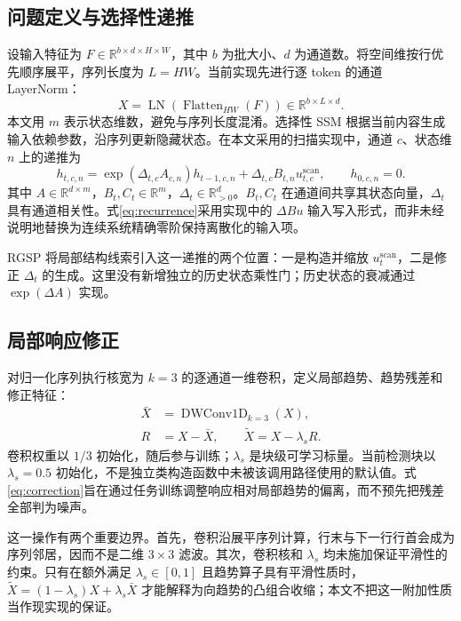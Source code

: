\documentclass[UTF8,11pt,a4paper,fontset=fandol]{ctexart}
\newcommand{\LN}{\operatorname{LN}}
\newcommand{\R}{\mathbb{R}}
\begin{document}
\subsection{问题定义与选择性递推}
设输入特征为 $F\in\R^{b\times d\times H\times W}$，其中 $b$ 为批大小、$d$ 为通道数。将空间维按行优先顺序展平，序列长度为 $L=HW$。当前实现先进行逐 token 的通道 LayerNorm：
\begin{equation}
X=\LN\!\left(\operatorname{Flatten}_{HW}(F)\right)\in\R^{b\times L\times d}.
\label{eq:tokens}
\end{equation}
本文用 $m$ 表示状态维数，避免与序列长度混淆。选择性 SSM 根据当前内容生成输入依赖参数，沿序列更新隐藏状态\cite{mamba2023}。在本文采用的扫描实现中，通道 $c$、状态维 $n$ 上的递推为
\begin{equation}
h_{t,c,n}=\exp(\Delta_{t,c}A_{c,n})h_{t-1,c,n}
          +\Delta_{t,c}B_{t,n}u^{\mathrm{scan}}_{t,c},
\qquad h_{0,c,n}=0.
\label{eq:recurrence}
\end{equation}
其中 $A\in\R^{d\times m}$，$B_t,C_t\in\R^m$，$\Delta_t\in\R^d_{>0}$。$B_t,C_t$ 在通道间共享其状态向量，$\Delta_t$ 具有通道相关性。式\eqref{eq:recurrence}采用实现中的 $\Delta B u$ 输入写入形式，而非未经说明地替换为连续系统精确零阶保持离散化的输入项。

RGSP 将局部结构线索引入这一递推的两个位置：一是构造并缩放 $u^{\mathrm{scan}}_t$，二是修正 $\Delta_t$ 的生成。这里没有新增独立的历史状态乘性门；历史状态的衰减通过 $\exp(\Delta A)$ 实现。

\subsection{局部响应修正}
对归一化序列执行核宽为 $k=3$ 的逐通道一维卷积，定义局部趋势、趋势残差和修正特征：
\begin{align}
\bar X&=\operatorname{DWConv1D}_{k=3}(X),\\
R&=X-\bar X,\qquad \widetilde X=X-\lambda_sR.
\label{eq:correction}
\end{align}
卷积权重以 $1/3$ 初始化，随后参与训练；$\lambda_s$ 是块级可学习标量。当前检测块以 $\lambda_s=0.5$ 初始化，不是独立类构造函数中未被该调用路径使用的默认值。式\eqref{eq:correction}旨在通过任务训练调整响应相对局部趋势的偏离，而不预先把残差全部判为噪声。

这一操作有两个重要边界。首先，卷积沿展平序列计算，行末与下一行行首会成为序列邻居，因而不是二维 $3\times3$ 滤波。其次，卷积核和 $\lambda_s$ 均未施加保证平滑性的约束。只有在额外满足 $\lambda_s\in[0,1]$ 且趋势算子具有平滑性质时，$\widetilde X=(1-\lambda_s)X+\lambda_s\bar X$ 才能解释为向趋势的凸组合收缩；本文不把这一附加性质当作现实现的保证。
\end{document}
